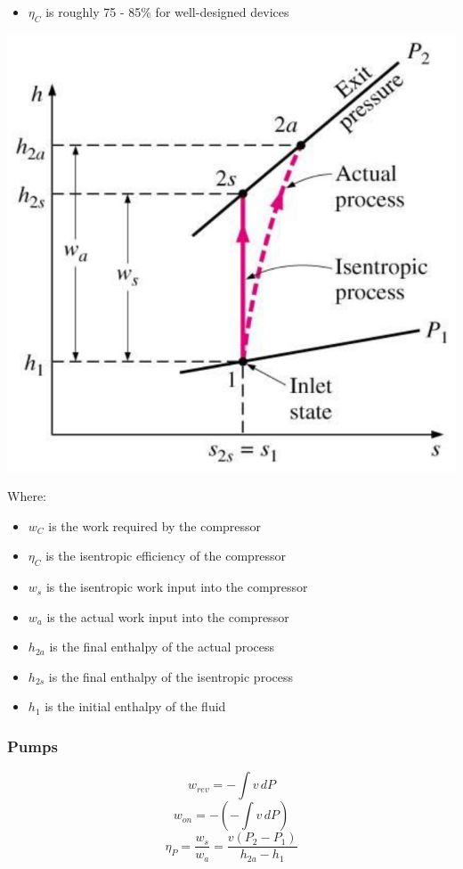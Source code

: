 \documentclass[11pt]{article}
\begin{document}
\begin{itemize}
\item \(\eta_C\) is roughly 75 - 85\% for well-designed devices
\end{itemize}

\begin{center}
\includegraphics[scale=0.8]{./images/isentropic-efficiency-of-compressors.png}
\end{center}

Where:
\begin{itemize}
\item \(w_C\) is the work required by the compressor
\item \(\eta_C\) is the isentropic efficiency of the compressor
\item \(w_s\) is the isentropic work input into the compressor
\item \(w_a\) is the actual work input into the compressor
\item \(h_{2a}\) is the final enthalpy of the actual process
\item \(h_{2s}\) is the final enthalpy of the isentropic process
\item \(h_1\) is the initial enthalpy of the fluid
\end{itemize}
\subsubsection{Pumps}
\label{sec:orgc4fbbf1}
\[w_{rev} = - \int v \, dP\]
\[w_{on} = - \left(- \int v \, dP \right)\]
\[\eta_P = \frac{w_s}{w_a} = \frac{v \left(P_2 - P_1 \right)}{h_{2a} - h_1}\]
\end{document}
